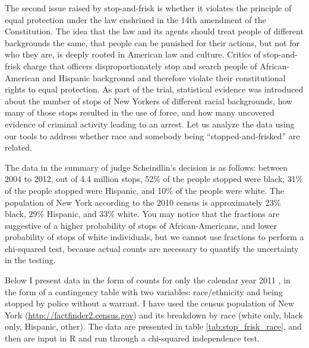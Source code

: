 \documentclass[
]{book}
\theoremstyle{definition}
\theoremstyle{definition}
\theoremstyle{definition}
\theoremstyle{remark}
\begin{document}
The second issue raised by stop-and-frisk is whether it violates the principle of equal protection under the law enshrined in the 14th amendment of the Constitution. The idea that the law and its agents should treat people of different backgrounds the same, that people can be punished for their actions, but not for who they are, is deeply rooted in American law and culture. Critics of stop-and-frisk charge that officers disproportionately stop and search people of African-American and Hispanic background and therefore violate their constitutional rights to equal protection. As part of the trial, statistical evidence was introduced about the number of stops of New Yorkers of different racial backgrounds, how many of those stops resulted in the use of force, and how many uncovered evidence of criminal activity leading to an arrest. Let us analyze the data using our tools to address whether race and somebody being ``stopped-and-frisked'' are related.

The data in the summary of judge Scheindlin's decision is as follows: between 2004 to 2012, out of 4.4 million stops, 52\% of the people stopped were black, 31\% of the people stopped were Hispanic, and 10\% of the people were white. The population of New York according to the 2010 census is approximately 23\% black, 29\% Hispanic, and 33\% white. You may notice that the fractions are suggestive of a higher probability of stops of African-Americans, and lower probability of stops of white individuals, but we cannot use fractions to perform a chi-squared test, because actual counts are necessary to quantify the uncertainty in the testing.

Below I present data in the form of counts for only the calendar year 2011 \citep{_nypds_????}, in the form of a contingency table with two variables: race/ethnicity and being stopped by police without a warrant. I have used the census population of New York (\url{http://factfinder2.census.gov}) and its breakdown by race (white only, black only, Hispanic, other). The data are presented in table \ref{tab:stop_frisk_race}, and then are input in R and run through a chi-squared independence test.
\end{document}
